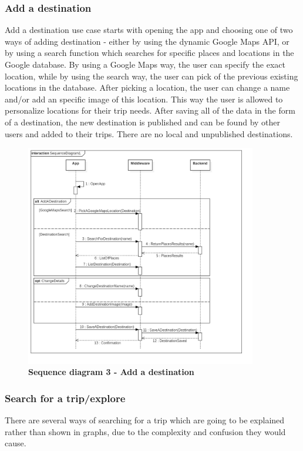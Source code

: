 \subsubsection{Add a destination}

\hspace{\parindent}Add a destination use case starts with opening the app and choosing one of two ways of adding destination - either by using the dynamic Google Maps API, or by using a search function which searches for specific places and locations in the Google database. By using a Google Maps way, the user can specify the exact location, while by using the search way, the user can pick of the previous existing locations in the database. After picking a location, the user can change a name and/or add an specific image of this location. This way the user is allowed to personalize locations for their trip needs. After saving all of the data in the form of a destination, the new destination is published and can be found by other users and added to their trips. There are no local and unpublished destinations.\\
\begin{figure}[!htb]
\centering
\includegraphics[width=0.9\textwidth]{../Graphs/Sequence3_Add_A_Destination.png}
\caption{\label{fig:dbapiuser}\textbf{Sequence diagram 3 - Add a destination}}
\end{figure}
\newpage
\subsubsection{Search for a trip/explore}
\hspace{\parindent}There are several ways of searching for a trip which are going to be explained rather than shown in graphs, due to the complexity and confusion they would cause.\\ \\

